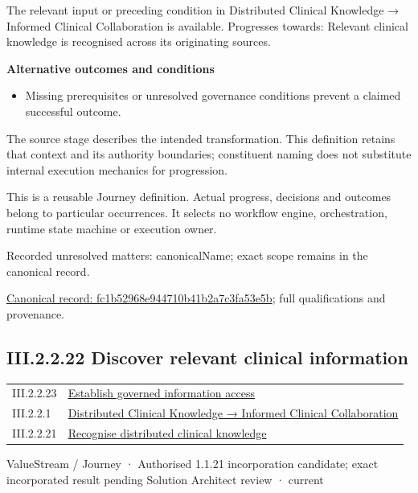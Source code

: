 The relevant input or preceding condition in Distributed Clinical Knowledge → Informed Clinical Collaboration is available. Progresses towards: Relevant clinical knowledge is recognised across its originating sources.



\par\medskip\textbf{Alternative outcomes and conditions}\par


\begin{itemize}


\item Missing prerequisites or unresolved governance conditions prevent a claimed successful outcome.

\end{itemize}


The source stage describes the intended transformation. This definition retains that context and its authority boundaries; constituent naming does not substitute internal execution mechanics for progression.



This is a reusable Journey definition. Actual progress, decisions and outcomes belong to particular occurrences. It selects no workflow engine, orchestration, runtime state machine or execution owner.


{\small Recorded unresolved matters: canonicalName; exact scope remains in the canonical record.}\par
{\footnotesize \href{../../../../continuum/strategy/value-stream/fc1b52968e944710b41b2a7c3fa53e5b.md}{Canonical record: fc1b52968e944710b41b2a7c3fa53e5b}; full qualifications and provenance.}\par
\subsection*{III.2.2.22 Discover relevant clinical information}
\label{navigation:III.2.2.22}

\begin{longtable}{p{.22\linewidth}p{.73\linewidth}}
III.2.2.23 & \hyperref[element:26719186d6444b5b80029fbf13ae7d06]{Establish governed information access} \\
III.2.2.1 & \hyperref[element:3ba98c0c1170458f8c02fa76694fee67]{Distributed Clinical Knowledge → Informed Clinical Collaboration} \\
III.2.2.21 & \hyperref[element:fc1b52968e944710b41b2a7c3fa53e5b]{Recognise distributed clinical knowledge} \\
\end{longtable}
\label{element:413213f085b44715a309f39b55ee3ee6}
{\small ValueStream / Journey · Authorised 1.1.21 incorporation candidate; exact incorporated result pending Solution Architect review · current}\par

